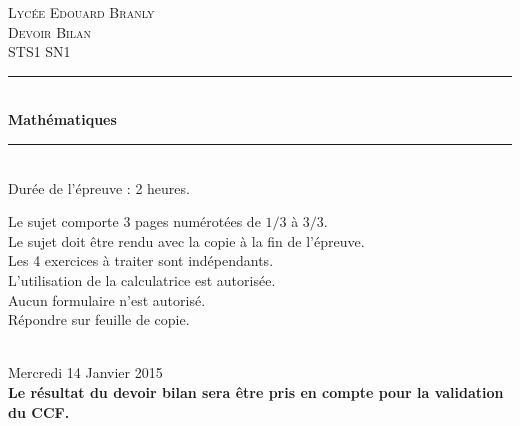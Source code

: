 \documentclass[12pt]{article}
\begin{document}
\begin{titlepage}

  \newcommand{\HRule}{\rule{\linewidth}{0.5mm}} %

  \center %
  
  \textsc{\LARGE Lycée Edouard Branly}\\[1.5cm] %
  
  \textsc{\Large Devoir Bilan}\\[0.5cm] %

  \textsc{\large STS1 SN1}\\[0.5cm] %

  \HRule \\[0.4cm]

  { \huge \bfseries Mathématiques}\\[0.4cm] %
  
  \HRule\\[2cm]

  {\huge Durée de l'épreuve : 2 heures.}\\[1.5cm]
  
  \begin{minipage}{0.8\textwidth}
    \begin{flushleft} \large
      Le sujet comporte $3$  pages numérotées de   $1/3$   à  $3/3$.\\
      Le sujet doit être rendu avec la copie à la fin de l’épreuve.\\
      Les 4 exercices à traiter sont indépendants.\\
      L'utilisation de la calculatrice est autorisée.\\
      Aucun formulaire n'est autorisé.\\
      Répondre sur feuille de copie.\\
    \end{flushleft}
  \end{minipage}\\[4cm]

  {\huge Mercredi 14 Janvier 2015}\\[3cm] 

  {\textbf{Le résultat du devoir bilan sera être pris en compte pour la validation du CCF.}}

  \vfill %

\end{titlepage}
\end{document}
